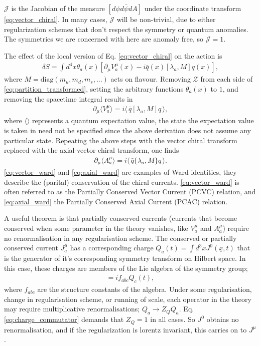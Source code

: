 $\mathcal{J}$ is the Jacobian of the measure $[d\psi d\bar{\psi} dA]$ under the coordinate transform \eqref{eq:vector_chiral}. In many cases, $\mathcal{J}$ will be non-trivial, due to either regularization schemes that don't respect the symmetry or quantum anomalies. The symmetries we are concerned with here are anomaly free, so $\mathcal{J}=1$.

The effect of the local version of Eq. \eqref{eq:vector_chiral} on the action is
\begin{align}
  \delta S = \int d^4x \theta_a(x) \left[ \partial_{\mu} V_a^{\mu}(x) - i\bar{q}(x) [\lambda_a,M] q(x) \right],
\end{align}
where $M = \text{diag}(m_u,m_d,m_s,...)$ acts on flavour. Removing $\mathcal{Z}$ from each side of \eqref{eq:partition_transformed}, setting the arbitrary functions $\theta_a(x)$ to $1$, and removing the spacetime integral results in
\begin{align}
  \partial_{\mu}\langle V_a^{\mu} \rangle = i \langle \, \bar{q} [ \lambda_a, M ] q \, \rangle,
  \label{eq:vector_ward}
\end{align}
where $\langle \rangle$ represents a quantum expectation value, the state the expectation value is taken in need not be specified since the above derivation does not assume any particular state. Repeating the above steps with the vector chiral transform replaced with the axial-vector chiral transform, one finds
\begin{align}
  \partial_{\mu}\langle A_a^{\mu} \rangle = i \langle\, \bar{q} \{ \lambda_a,M \} q \,\rangle.
  \label{eq:axial_ward}
\end{align}
\eqref{eq:vector_ward} and \eqref{eq:axial_ward} are examples of Ward identities, they describe the (parital) conservation of the chiral currents. \eqref{eq:vector_ward} is often referred to as the Partially Conserved Vector Current (PCVC) relation, and \eqref{eq:axial_ward} the Partially Conserved Axial Current (PCAC) relation.

A useful theorem \cite{Fubini:1964boa} is that partially conserved currents (currents that become conserved when some parameter in the theory vanishes, like $V^{\mu}_a$ and $A^{\mu}_a$) require no renormalisation in any regularisation scheme. %
The conserved or partially conserved current $J_a^{\mu}$ has a corresponding charge $Q_a(t) = \int d^3x J^{0}(\underline{x},t)$ that is the generator of it's corresponding symmetry transform on Hilbert space. In this case, these charges are members of the Lie algebra of the symmetry group;
\begin{align}
  [ Q_a(t), Q_b(t) ] = if_{abc} Q_c(t),
  \label{eq:charge_commutator}
\end{align}
where $f_{abc}$ are the structure constants of the algebra. Under some regularisation, change in regularisation scheme, or running of scale, each operator in the theory may require multiplicative renormalisations; $Q_a \to Z_Q Q_a$. Eq. \eqref{eq:charge_commutator} demands that $Z_Q=1$ in all cases. So $J^0$ obtains no renormalisation, and if the regularization is lorentz invariant, this carries on to $J^{\mu}$.

